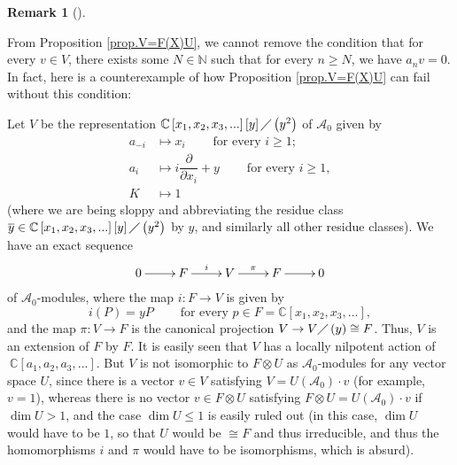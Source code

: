 \documentclass
[numbers=enddot,12pt,final,onecolumn,german,notitlepage]{scrartcl}%
\theoremstyle{definition}
\newtheorem{remk}[theo]{Remark}
\newenvironment{remark}[1][]
{\begin{remk}[#1]\begin{leftbar}}
{\end{leftbar}\end{remk}}
\begin{document}
\begin{remark}
From Proposition \ref{prop.V=F(X)U}, we cannot remove the condition that for
every $v\in V$, there exists some $N\in\mathbb{N}$ such that for every $n\geq
N$, we have $a_{n}v=0$. In fact, here is a counterexample of how Proposition
\ref{prop.V=F(X)U} can fail without this condition:

Let $V$ be the representation $\mathbb{C}\left[  x_{1},x_{2},x_{3},...\right]
\left[  y\right]  \diagup\left(  y^{2}\right)  $ of $\mathcal{A}_{0}$ given
by
\begin{align*}
a_{-i}  &  \mapsto x_{i}\ \ \ \ \ \ \ \ \ \ \text{for every }i\geq1;\\
a_{i}  &  \mapsto i\dfrac{\partial}{\partial x_{i}}%
+y\ \ \ \ \ \ \ \ \ \ \text{for every }i\geq1,\\
K  &  \mapsto1
\end{align*}
(where we are being sloppy and abbreviating the residue class $\overline{y}%
\in\mathbb{C}\left[  x_{1},x_{2},x_{3},...\right]  \left[  y\right]
\diagup\left(  y^{2}\right)  $ by $y$, and similarly all other residue
classes). We have an exact sequence%
\[%
\xymatrix{
0 \ar[r] & F \ar[r]^i & V \ar[r]^{\pi} & F \ar[r] & 0
}%
\]
of $\mathcal{A}_{0}$-modules, where the map $i:F\rightarrow V$ is given by%
\[
i\left(  P\right)  =yP\ \ \ \ \ \ \ \ \ \ \text{for every }p\in F=\mathbb{C}%
\left[  x_{1},x_{2},x_{3},...\right]  ,
\]
and the map $\pi:V\rightarrow F$ is the canonical projection $V\rightarrow
V\diagup\left(  y\right)  \cong F$. Thus, $V$ is an extension of $F$ by $F$.
It is easily seen that $V$ has a locally nilpotent action of$\ \mathbb{C}%
\left[  a_{1},a_{2},a_{3},...\right]  $. But $V$ is not isomorphic to
$F\otimes U$ as $\mathcal{A}_{0}$-modules for any vector space $U$, since
there is a vector $v\in V$ satisfying $V=U\left(  \mathcal{A}_{0}\right)
\cdot v$ (for example, $v=1$), whereas there is no vector $v\in F\otimes U$
satisfying $F\otimes U=U\left(  \mathcal{A}_{0}\right)  \cdot v$ if $\dim
U>1$, and the case $\dim U\leq1$ is easily ruled out (in this case, $\dim U$
would have to be $1$, so that $U$ would be $\cong F$ and thus irreducible, and
thus the homomorphisms $i$ and $\pi$ would have to be isomorphisms, which is absurd).
\end{remark}
\end{document}
